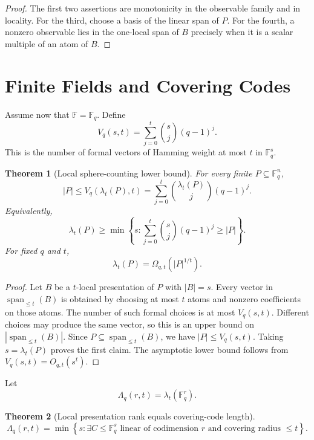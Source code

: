 \documentclass[11pt]{article}
\newtheorem{theorem}{Theorem}[section]
\begin{document}
\begin{proof}
The first two assertions are monotonicity in the observable family and in locality. For the third, choose a basis of the linear span of $P$. For the fourth, a nonzero observable lies in the one-local span of $B$ precisely when it is a scalar multiple of an atom of $B$.
\end{proof}

\section{Finite Fields and Covering Codes}

Assume now that $\mathbb F=\mathbb F_q$. Define
\[
V_q(s,t)=\sum_{j=0}^t {s\choose j}(q-1)^j.
\]
This is the number of formal vectors of Hamming weight at most $t$ in $\mathbb F_q^s$.

\begin{theorem}[Local sphere-counting lower bound]
For every finite $P\subseteq\mathbb F_q^n$,
\[
|P|\le V_q(\lambda_t(P),t)
=
\sum_{j=0}^t {\lambda_t(P)\choose j}(q-1)^j.
\]
Equivalently,
\[
\lambda_t(P)
\ge
\min\left\{
s:\sum_{j=0}^t {s\choose j}(q-1)^j\ge |P|
\right\}.
\]
For fixed $q$ and $t$,
\[
\lambda_t(P)=\Omega_{q,t}(|P|^{1/t}).
\]
\end{theorem}

\begin{proof}
Let $B$ be a $t$-local presentation of $P$ with $|B|=s$. Every vector in $\operatorname{span}_{\le t}(B)$ is obtained by choosing at most $t$ atoms and nonzero coefficients on those atoms. The number of such formal choices is at most $V_q(s,t)$. Different choices may produce the same vector, so this is an upper bound on $|\operatorname{span}_{\le t}(B)|$. Since $P\subseteq \operatorname{span}_{\le t}(B)$, we have $|P|\le V_q(s,t)$. Taking $s=\lambda_t(P)$ proves the first claim. The asymptotic lower bound follows from $V_q(s,t)=O_{q,t}(s^t)$.
\end{proof}

Let
\[
\Lambda_q(r,t)=\lambda_t(\mathbb F_q^r).
\]

\begin{theorem}[Local presentation rank equals covering-code length]
\[
\Lambda_q(r,t)
=
\min\left\{
s:
\exists C\le\mathbb F_q^s
\text{ linear of codimension }r
\text{ and covering radius }\le t
\right\}.
\]
\end{theorem}
\end{document}
